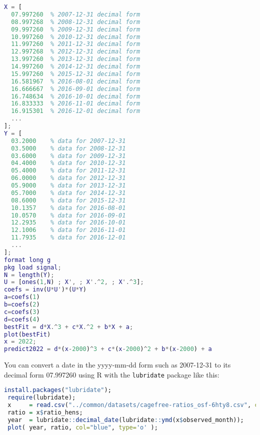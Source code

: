\begin{lstlisting}[language=matlab]
% years - 2000
X = [ 
  07.997260  % 2007-12-31 decimal form
  08.997268  % 2008-12-31 decimal form
  09.997260  % 2009-12-31 decimal form
  10.997260  % 2010-12-31 decimal form
  11.997260  % 2011-12-31 decimal form
  12.997268  % 2012-12-31 decimal form
  13.997260  % 2013-12-31 decimal form
  14.997260  % 2014-12-31 decimal form
  15.997260  % 2015-12-31 decimal form
  16.581967  % 2016-08-01 decimal form
  16.666667  % 2016-09-01 decimal form
  16.748634  % 2016-10-01 decimal form
  16.833333  % 2016-11-01 decimal form
  16.915301  % 2016-12-01 decimal form
  ...
];
Y = [
  03.2000    % data for 2007-12-31
  03.5000    % data for 2008-12-31
  03.6000    % data for 2009-12-31
  04.4000    % data for 2010-12-31
  05.4000    % data for 2011-12-31
  06.0000    % data for 2012-12-31
  05.9000    % data for 2013-12-31
  05.7000    % data for 2014-12-31
  08.6000    % data for 2015-12-31
  10.1357    % data for 2016-08-01
  10.0570    % data for 2016-09-01
  12.2935    % data for 2016-10-01
  12.1006    % data for 2016-11-01
  11.7935    % data for 2016-12-01
  ...
];
format long g
pkg load signal;
N = length(Y);
U = [ones(1,N) ; X', ; X'.^2, ; X'.^3];
coefs = inv(U*U')*(U*Y)
a=coefs(1)
b=coefs(2)
c=coefs(3)
d=coefs(4)
bestFit = d*X.^3 + c*X.^2 + b*X + a;
plot(bestFit)
x = 2022;
predict2022 = d*(x-2000)^3 + c*(x-2000)^2 + b*(x-2000) + a
\end{lstlisting}
You can convert a date in the yyyy-mm-dd form such as 2007-12-31 to its decimal form 07.997260
using R with the \lstinline[language=R]{lubridate} package like this:
\begin{lstlisting}[language=R]
 install.packages("lubridate");
 require(lubridate);
 x     = read.csv("../common/datasets/cagefree-ratios_osf-6hty8.csv", comment.char = "#");
 ratio = x$ratio_hens;
 year  = lubridate::decimal_date(lubridate::ymd(x$observed_month));
 plot( year, ratio, col="blue", type='o' );
\end{lstlisting}

